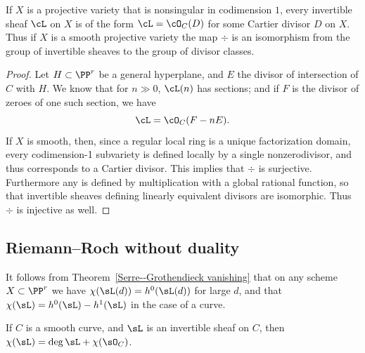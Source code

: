\begin{corollary}\label{invertible sheaves and divisors}
If $X$ is a projective variety that is nonsingular in codimension $1$,
every invertible sheaf $\cL$ on $X$ is of the form $\cL =\cO_C(D)$ for some 
%
Cartier divisor $D$ on $X$. Thus if $X$ is a smooth projective variety
%
the map $\div$ is an isomorphism from the group of invertible sheaves
to the group 
of divisor classes.
\end{corollary}

\begin{proof}
Let $H \subset \PP^r$ be a general hyperplane, and $E$  the divisor  of intersection of $C$ with $H$. We know that for $n \gg 0$, $\cL(n)$ has sections; and if $F$ is the divisor of zeroes of one such section, we have
$$
\cL = \cO_C(F - nE).
$$
If $X$ is smooth, then, since a regular local ring is a unique
factorization domain, every codimension-1 subvariety is defined locally 
by a single nonzerodivisor, and thus corresponds to a Cartier divisor.
This implies that $\div$ is surjective. Furthermore any 
%
is defined by multiplication with a global rational function, so that invertible sheaves defining linearly equivalent divisors are
isomorphic. Thus $\div$ is injective as well.
\end{proof}

\subsection*{Riemann--Roch without duality}

It follows from Theorem~\ref{Serre--Grothendieck vanishing} that on
any scheme $X\subset \PP^r$ we have $\chi(\sL(d)) = h^0(\sL(d))$ for
large $d$, 
and that $\chi(\sL) = h^0(\sL) - h^1(\sL)$ in the case of a curve.

\begin{theorem}\label{easy RR}
If $C$ is a smooth curve, and $\sL$ is an invertible sheaf on $C$, then $\chi(\sL) = \deg \sL + \chi(\sO_C)$.
%
\end{theorem}

